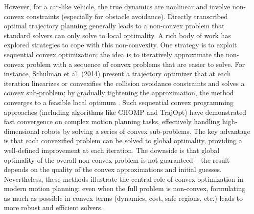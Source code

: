 However, for a car-like vehicle, the true dynamics are nonlinear and involve non-convex constraints (especially for obstacle avoidance).
Directly transcribed optimal trajectory planning generally leads to a non-convex problem that standard solvers can only solve to local optimality.
A rich body of work has explored strategies to cope with this non-convexity.
One strategy is to exploit sequential convex optimization: the idea is to iteratively approximate the non-convex problem with a sequence of convex
problems that are easier to solve.
For instance, Schulman et al.
(2014) present a trajectory optimizer that at each iteration linearizes or convexifies the collision avoidance constraints and solves a convex sub-problem; by gradually tightening the approximation, the method converges to a feasible local optimum \cite{schulman_finding_2013}.
Such sequential convex programming approaches (including algorithms like CHOMP and TrajOpt) have demonstrated fast convergence on complex motion
planning tasks, effectively handling high-dimensional robots by solving a series of convex sub-problems.
The key advantage is that each convexified problem can be solved to global optimality, providing a well-defined improvement at each iteration.
The downside is that global optimality of the overall non-convex problem is not guaranteed – the result depends on the quality of the convex
approximations and initial guesses.
Nevertheless, these methods illustrate the central role of convex optimization in modern motion planning: even when the full problem is non-convex,
formulating as much as possible in convex terms (dynamics, cost, safe regions, etc.) leads to more robust and efficient solvers.

